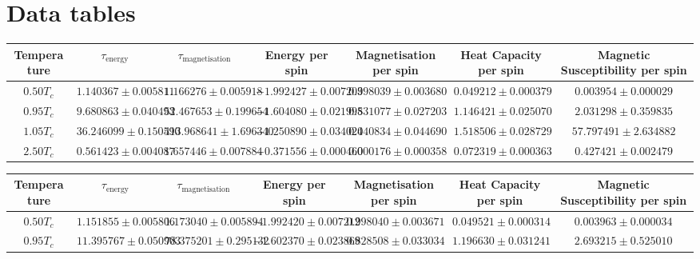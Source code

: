 \chapter*{Data tables}

\begin{sidewaystable}[h!]
    \centering
    \begin{tabular}{|c|c|c|c|c|c|c|}
        \hline
        Temperature & 
        $\tau_\text{energy}$ & 
        $\tau_\text{magnetisation}$ & 
        Energy per spin & 
        Magnetisation per spin & 
        Heat Capacity per spin & 
        Magnetic Susceptibility per spin \\ 
        \hline
        $0.50 T_c$ & $1.140367 \pm 0.005811$ & $1.166276 \pm 0.005918$ & $-1.992427 \pm 0.007203$ & $0.998039 \pm 0.003680$ & $0.049212 \pm 0.000379$ & $0.003954 \pm 0.000029$ \\
        \hline
        $0.95 T_c$ & $9.680863 \pm 0.040493$ & $52.467653 \pm 0.199654$ & $-1.604080 \pm 0.021995$ & $0.831077 \pm 0.027203$ & $1.146421 \pm 0.025070$ & $2.031298 \pm 0.359835$ \\
        \hline
        $1.05 T_c$ & $36.246099 \pm 0.150590$ & $413.968641 \pm 1.696340$ & $-1.250890 \pm 0.034024$ & $0.040834 \pm 0.044690$ & $1.518506 \pm 0.028729$ & $57.797491 \pm 2.634882$ \\
        \hline
        $2.50 T_c$ & $0.561423 \pm 0.004087$ & $1.657446 \pm 0.007884$ & $-0.371556 \pm 0.000460$ & $0.000176 \pm 0.000358$ & $0.072319 \pm 0.000363$ & $0.427421 \pm 0.002479$ \\
        \hline
    \end{tabular}
    \caption{Autocorrelation time and selected observables for the square lattice with side $L = 25$}
    \label{lec5:results_side25}
    \vspace{30pt}
    \centering
    \begin{tabular}{|c|c|c|c|c|c|c|}
        \hline
        Temperature & 
        $\tau_\text{energy}$ & 
        $\tau_\text{magnetisation}$ & 
        Energy per spin & 
        Magnetisation per spin & 
        Heat Capacity per spin & 
        Magnetic Susceptibility per spin \\ 
        \hline
        $0.50 T_c$ & $1.151855 \pm 0.005806$ & $1.173040 \pm 0.005894$ & $-1.992420 \pm 0.007212$ & $0.998040 \pm 0.003671$ & $0.049521 \pm 0.000314$ & $0.003963 \pm 0.000034$ \\
        \hline
        $0.95 T_c$ & $11.395767 \pm 0.050903$ & $78.375201 \pm 0.295132$ & $-1.602370 \pm 0.023869$ & $0.828508 \pm 0.033034$ & $1.196630 \pm 0.031241$ & $2.693215 \pm 0.525010$ \\

\end{tabular}
\end{sidewaystable}
